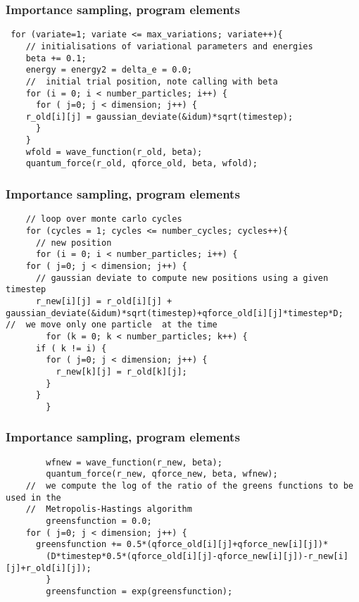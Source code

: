 \documentclass{beamer}
\begin{document}
\begin{frame}
\frametitle{Importance sampling, program elements}

\begin{block}{}
\begin{verbatim}
 for (variate=1; variate <= max_variations; variate++){
    // initialisations of variational parameters and energies 
    beta += 0.1;  
    energy = energy2 = delta_e = 0.0;
    //  initial trial position, note calling with beta 
    for (i = 0; i < number_particles; i++) { 
      for ( j=0; j < dimension; j++) {
	r_old[i][j] = gaussian_deviate(&idum)*sqrt(timestep);
      }
    }
    wfold = wave_function(r_old, beta);
    quantum_force(r_old, qforce_old, beta, wfold);
\end{verbatim}

\end{block}
\end{frame}

\begin{frame}
\frametitle{Importance sampling, program elements}

\begin{block}{}
\begin{verbatim}
    // loop over monte carlo cycles 
    for (cycles = 1; cycles <= number_cycles; cycles++){ 
      // new position 
      for (i = 0; i < number_particles; i++) { 
	for ( j=0; j < dimension; j++) {
	  // gaussian deviate to compute new positions using a given timestep
	  r_new[i][j] = r_old[i][j] + gaussian_deviate(&idum)*sqrt(timestep)+qforce_old[i][j]*timestep*D;
//  we move only one particle  at the time
        for (k = 0; k < number_particles; k++) {
	  if ( k != i) {
	    for ( j=0; j < dimension; j++) {
	      r_new[k][j] = r_old[k][j];
	    }
	  } 
        }
\end{verbatim}
\end{block}
\end{frame}

\begin{frame}
\frametitle{Importance sampling, program elements}

\begin{block}{}
\begin{verbatim}
        wfnew = wave_function(r_new, beta); 
        quantum_force(r_new, qforce_new, beta, wfnew);
	//  we compute the log of the ratio of the greens functions to be used in the 
	//  Metropolis-Hastings algorithm
        greensfunction = 0.0;            
	for ( j=0; j < dimension; j++) {
	  greensfunction += 0.5*(qforce_old[i][j]+qforce_new[i][j])*
	    (D*timestep*0.5*(qforce_old[i][j]-qforce_new[i][j])-r_new[i][j]+r_old[i][j]);
        }
        greensfunction = exp(greensfunction);

\end{verbatim}
\end{block}
\end{frame}
\end{document}
